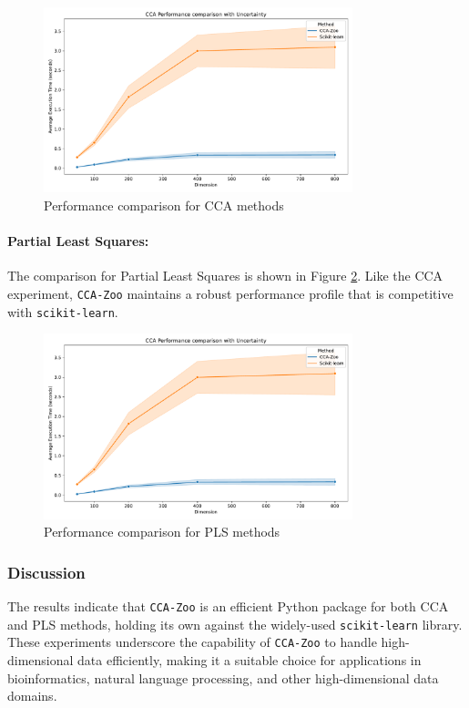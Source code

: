 \begin{figure}[h]
\centering
\includegraphics[width=0.8\textwidth]{figures/CCA_Speed_Benchmark}
\caption{Performance comparison for CCA methods}
\label{fig:cca_benchmark}
\end{figure}

\paragraph{Partial Least Squares:}
The comparison for Partial Least Squares is shown in Figure \ref{fig:pls_benchmark}.
Like the CCA experiment, \texttt{CCA-Zoo} maintains a robust performance profile that is competitive with \texttt{scikit-learn}.

\begin{figure}[h]
\centering
\includegraphics[width=0.8\textwidth]{figures/CCA_Speed_Benchmark}
\caption{Performance comparison for PLS methods}
\label{fig:pls_benchmark}
\end{figure}

\subsubsection{Discussion}

The results indicate that \texttt{CCA-Zoo} is an efficient Python package for both CCA and PLS methods, holding its own against the widely-used \texttt{scikit-learn} library.
These experiments underscore the capability of \texttt{CCA-Zoo} to handle high-dimensional data efficiently, making it a suitable choice for applications in bioinformatics, natural language processing, and other high-dimensional data domains.

